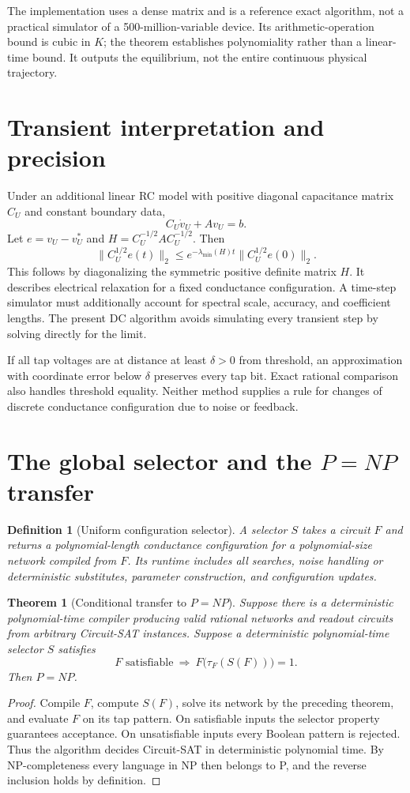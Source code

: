 \documentclass[11pt]{article}
\newtheorem{theorem}{Theorem}
\newtheorem{definition}{Definition}
\begin{document}
The implementation uses a dense matrix and is a reference exact
algorithm, not a practical simulator of a 500-million-variable device.
Its arithmetic-operation bound is cubic in $K$; the theorem establishes
polynomiality rather than a linear-time bound. It outputs the equilibrium,
not the entire continuous physical trajectory.

\section{Transient interpretation and precision}
Under an additional linear RC model with positive diagonal capacitance
matrix $C_U$ and constant boundary data,
\[
C_U\dot v_U+Av_U=b.
\]
Let $e=v_U-v_U^\ast$ and
$H=C_U^{-1/2}AC_U^{-1/2}$. Then
\[
\|C_U^{1/2}e(t)\|_2
\leq e^{-\lambda_{\min}(H)t}\|C_U^{1/2}e(0)\|_2.
\]
This follows by diagonalizing the symmetric positive definite matrix
$H$. It describes electrical relaxation for a fixed conductance
configuration. A time-step simulator must additionally account for
spectral scale, accuracy, and coefficient lengths.
The present DC algorithm avoids simulating every transient step by
solving directly for the limit.

If all tap voltages are at distance at least $\delta>0$ from threshold,
an approximation with coordinate error below $\delta$ preserves every
tap bit. Exact rational comparison also handles threshold equality.
Neither method supplies a rule for changes of discrete conductance
configuration due to noise or feedback.

\section{The global selector and the $P=NP$ transfer}
\begin{definition}[Uniform configuration selector]
A selector $S$ takes a circuit $F$ and returns a polynomial-length
conductance configuration for a polynomial-size network compiled from
$F$. Its runtime includes all searches, noise handling or deterministic
substitutes, parameter construction, and configuration updates.
\end{definition}

\begin{theorem}[Conditional transfer to $P=NP$]
Suppose there is a deterministic polynomial-time compiler producing
valid rational networks and readout circuits from arbitrary Circuit-SAT
instances. Suppose a deterministic polynomial-time selector $S$
satisfies
\[
F\text{ satisfiable}\ \Longrightarrow\
F\bigl(\tau_F(S(F))\bigr)=1.
\]
Then $P=NP$.
\end{theorem}
\begin{proof}
Compile $F$, compute $S(F)$, solve its network by the preceding theorem,
and evaluate $F$ on its tap pattern. On satisfiable inputs the selector
property guarantees acceptance. On unsatisfiable inputs every Boolean
pattern is rejected. Thus the algorithm decides Circuit-SAT in
deterministic polynomial time. By NP-completeness every language in NP
then belongs to P, and the reverse inclusion holds by definition.
\end{proof}
\end{document}
